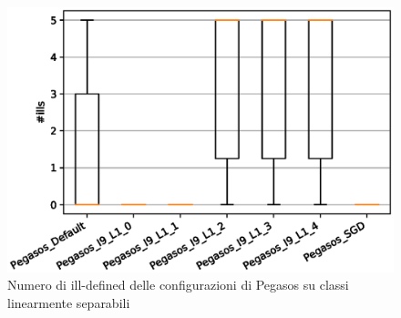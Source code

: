 \documentclass[12pt,a4paper,oneside,hidelinks]{report}
\begin{document}
\begin{figure}[hb]%
    \centering
    \includegraphics[scale = 0.80]{CC-Pegasos-ills-LS.eps}%
    \caption{Numero di ill-defined delle configurazioni di Pegasos su classi linearmente separabili}%
    \label{figure:ill14}%
\end{figure}

\vspace*{\fill}


\vspace*{\fill}
\end{document}
